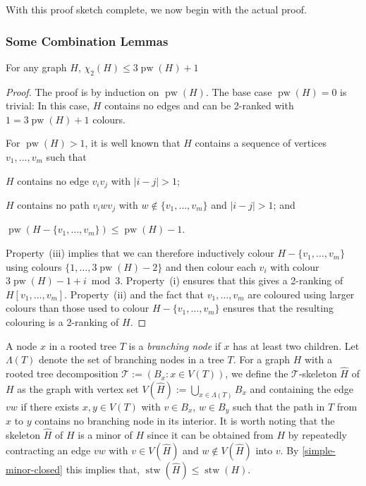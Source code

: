 \documentclass[kpfonts]{patmorin}
\DeclareMathOperator{\stw}{stw}
\DeclareMathOperator{\pw}{pw}
\newcommand{\trn}{\chi_2}
\theoremstyle{named}
\begin{document}
With this proof sketch complete, we now begin with the actual proof.

\subsubsection{Some Combination Lemmas}

\begin{lem}\label{pathwidth}
    For any graph $H$, $\trn(H)\le 3\pw(H) + 1$
\end{lem}

\begin{proof}
    The proof is by induction on $\pw(H)$.  The base case $\pw(H)=0$ is trivial: In this case, $H$ contains no edges and can be 2-ranked with $1 = 3\pw(H)+1$ colours.

    For $\pw(H)>1$, it is well known that $H$ contains a sequence of vertices $v_1,\ldots,v_m$  such that
    \begin{inparaenum}[(i)]
        \item $H$ contains no edge $v_iv_j$ with $|i-j|>1$;
        \item $H$ contains no path $v_iw v_j$ with $w\not\in\{v_1,\ldots,v_m\}$ and $|i-j|>1$; and
        \item $\pw(H-\{v_1,\ldots,v_m\})\le \pw(H)-1$.
    \end{inparaenum}
    Property~(iii) implies that we can therefore inductively colour $H-\{v_1,\ldots,v_m\}$ using colours $\{1,\ldots,3\pw(H)-2\}$ and then colour each $v_i$ with colour $3\pw(H)-1+i\bmod 3$.  Property~(i) ensures that this gives a 2-ranking of $H[v_1,\ldots,v_m]$.  Property~(ii) and the fact that $v_1,\ldots,v_m$ are coloured using larger colours than those used to colour $H-\{v_1,\ldots,v_m\}$ ensures that the resulting colouring is a 2-ranking of $H$.
\end{proof}

A node $x$ in a rooted tree $T$ is a \emph{branching node} if $x$ has at least two children.  Let $\Lambda(T)$ denote the set of branching nodes in a tree $T$. For a graph $H$ with a rooted tree decomposition $\mathcal{T}:=(B_x:x\in V(T))$, we define the $\mathcal{T}$-skeleton $\hat{H}$ of $H$ as the graph with vertex set $V(\hat{H}):=\bigcup_{x\in \Lambda(T)} B_x$ and containing the edge $vw$ if there exists $x,y\in V(T)$ with $v\in B_x$, $w\in B_y$ such that the path in $T$ from $x$ to $y$ contains no branching node in its interior.  It is worth noting that the skeleton $\hat{H}$ of $H$ is a minor of $H$ since it can be obtained from $H$ by repeatedly contracting an edge $vw$ with $v\in V(\hat{H})$ and $w\not\in V(\hat{H})$ into $v$. By \cref{simple-minor-closed} this implies that, $\stw(\hat{H})\le\stw(H)$.
\end{document}
